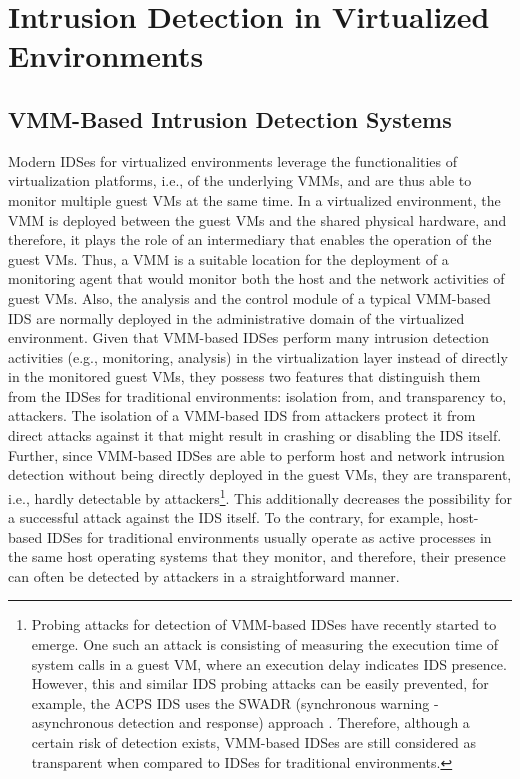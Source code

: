 \section{Intrusion Detection in Virtualized Environments}
\label{sec:intrusion_detection_in_virtualized_environments}


\subsection{VMM-Based Intrusion Detection Systems}
\label{sec:vmm_based}

Modern IDSes for virtualized environments leverage the functionalities of virtualization platforms, i.e., of the underlying VMMs, and are thus able to monitor multiple guest VMs at the same time. In a virtualized environment, the VMM is deployed between the guest VMs and the shared physical hardware, and therefore, it plays the role of an intermediary that enables the operation of the guest VMs. Thus, a VMM is a suitable location for the deployment of a monitoring agent that would monitor both the host and the network activities of guest VMs. Also, the analysis and the control module of a typical VMM-based IDS are normally deployed in the administrative domain of the virtualized environment. Given that VMM-based IDSes perform many intrusion detection activities (e.g., monitoring, analysis) in the virtualization layer instead of directly in the monitored guest VMs, they possess two features that distinguish them from the IDSes for traditional environments: isolation from, and transparency to, attackers. The isolation of a VMM-based IDS from attackers protect it from direct attacks against it that might result in crashing or disabling the IDS itself. Further, since VMM-based IDSes are able to perform host and network intrusion detection without being directly deployed in the guest VMs, they are transparent, i.e., hardly detectable by attackers\footnote{Probing attacks for detection of VMM-based IDSes have recently started to emerge. One such an attack is consisting of measuring the execution time of system calls in a guest VM, where an execution delay indicates IDS presence. However, this and similar IDS probing attacks can be easily prevented, for example, the ACPS IDS uses the SWADR (synchronous warning - asynchronous detection and response) approach \cite{lombardi:secure}. Therefore, although a certain risk of detection exists, VMM-based IDSes are still considered as transparent when compared to IDSes for traditional environments.}.  This additionally decreases the possibility for a successful attack against the IDS itself. To the contrary, for example, host-based IDSes for traditional environments usually operate as active processes in the same host operating systems that they monitor, and therefore, their presence can often be detected by attackers in a straightforward manner. 

